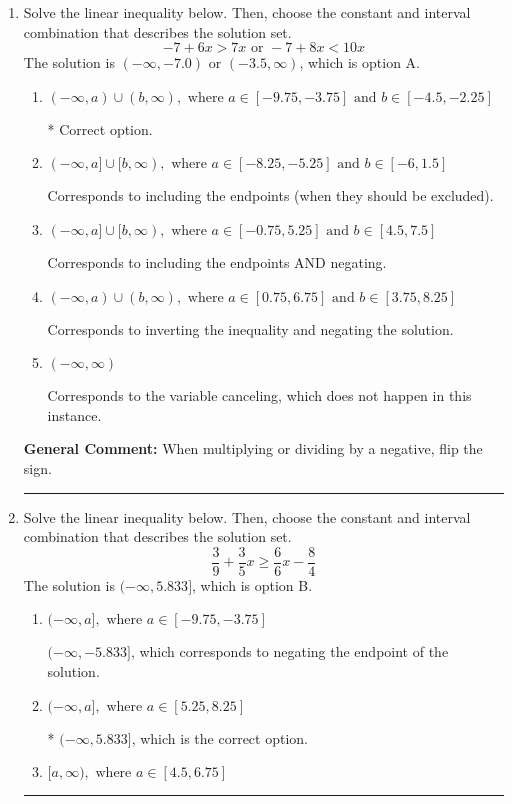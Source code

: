 \documentclass{extbook}[14pt]
\newcommand{\litem}[1]{\item #1

\rule{\textwidth}{0.4pt}}
\begin{document}
\begin{enumerate}\litem{
Solve the linear inequality below. Then, choose the constant and interval combination that describes the solution set.
\[ -7 + 6 x > 7 x \text{ or } -7 + 8 x < 10 x \]The solution is \( (-\infty, -7.0) \text{ or } (-3.5, \infty) \), which is option A.\begin{enumerate}[label=\Alph*.]
\item \( (-\infty, a) \cup (b, \infty), \text{ where } a \in [-9.75, -3.75] \text{ and } b \in [-4.5, -2.25] \)

 * Correct option.
\item \( (-\infty, a] \cup [b, \infty), \text{ where } a \in [-8.25, -5.25] \text{ and } b \in [-6, 1.5] \)

Corresponds to including the endpoints (when they should be excluded).
\item \( (-\infty, a] \cup [b, \infty), \text{ where } a \in [-0.75, 5.25] \text{ and } b \in [4.5, 7.5] \)

Corresponds to including the endpoints AND negating.
\item \( (-\infty, a) \cup (b, \infty), \text{ where } a \in [0.75, 6.75] \text{ and } b \in [3.75, 8.25] \)

Corresponds to inverting the inequality and negating the solution.
\item \( (-\infty, \infty) \)

Corresponds to the variable canceling, which does not happen in this instance.
\end{enumerate}

\textbf{General Comment:} When multiplying or dividing by a negative, flip the sign.
}
\litem{
Solve the linear inequality below. Then, choose the constant and interval combination that describes the solution set.
\[ \frac{3}{9} + \frac{3}{5} x \geq \frac{6}{6} x - \frac{8}{4} \]The solution is \( (-\infty, 5.833] \), which is option B.\begin{enumerate}[label=\Alph*.]
\item \( (-\infty, a], \text{ where } a \in [-9.75, -3.75] \)

 $(-\infty, -5.833]$, which corresponds to negating the endpoint of the solution.
\item \( (-\infty, a], \text{ where } a \in [5.25, 8.25] \)

* $(-\infty, 5.833]$, which is the correct option.
\item \( [a, \infty), \text{ where } a \in [4.5, 6.75] \)


\end{enumerate}}
\end{enumerate}
\end{document}
